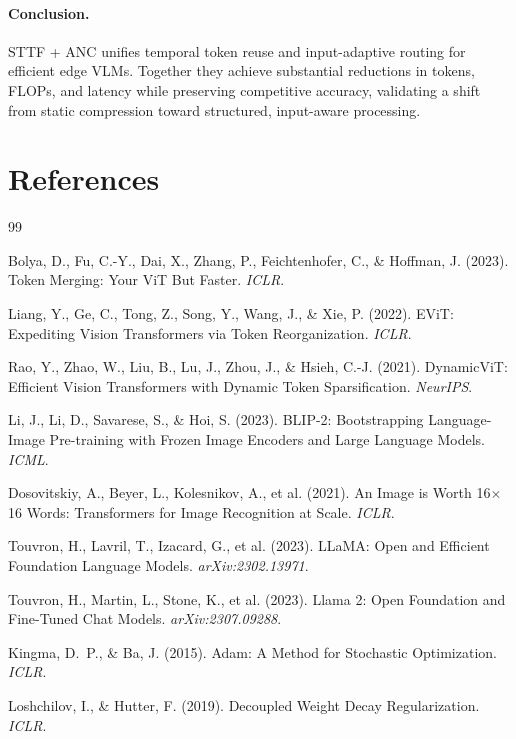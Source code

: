 \documentclass{article}
\begin{document}
\paragraph{Conclusion.}
STTF + ANC unifies temporal token reuse and input-adaptive routing for efficient edge VLMs. Together they achieve substantial reductions in tokens, FLOPs, and latency while preserving competitive accuracy, validating a shift from static compression toward structured, input-aware processing.


\section*{References}
\medskip

{\small
\begin{thebibliography}{99}

Bolya, D., Fu, C.-Y., Dai, X., Zhang, P., Feichtenhofer, C., \& Hoffman, J. (2023). Token Merging: Your ViT But Faster. \emph{ICLR}.

Liang, Y., Ge, C., Tong, Z., Song, Y., Wang, J., \& Xie, P. (2022). EViT: Expediting Vision Transformers via Token Reorganization. \emph{ICLR}.

Rao, Y., Zhao, W., Liu, B., Lu, J., Zhou, J., \& Hsieh, C.-J. (2021). DynamicViT: Efficient Vision Transformers with Dynamic Token Sparsification. \emph{NeurIPS}.

Li, J., Li, D., Savarese, S., \& Hoi, S. (2023). BLIP-2: Bootstrapping Language-Image Pre-training with Frozen Image Encoders and Large Language Models. \emph{ICML}.

Dosovitskiy, A., Beyer, L., Kolesnikov, A., et al. (2021). An Image is Worth 16$\times$16 Words: Transformers for Image Recognition at Scale. \emph{ICLR}.

Touvron, H., Lavril, T., Izacard, G., et al. (2023). LLaMA: Open and Efficient Foundation Language Models. \emph{arXiv:2302.13971}.

Touvron, H., Martin, L., Stone, K., et al. (2023). Llama 2: Open Foundation and Fine-Tuned Chat Models. \emph{arXiv:2307.09288}.

Kingma, D.~P., \& Ba, J. (2015). Adam: A Method for Stochastic Optimization. \emph{ICLR}.

Loshchilov, I., \& Hutter, F. (2019). Decoupled Weight Decay Regularization. \emph{ICLR}.


\end{thebibliography}}
\end{document}
